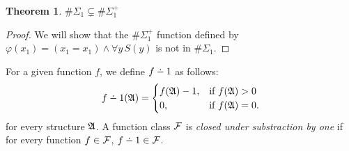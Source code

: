 \documentclass[12pt]{article}
\def\dotminus{\mathbin{\ooalign{\hss\raise1ex\hbox{.}\hss\cr
  \mathsurround=0pt$-$}}}
\def\E1{\#\Sigma_1^{+}}
\def\A{{\frak A}}
\def\F{{\cal F}}
\newtheorem{theo}{Theorem}
\begin{document}
\begin{theo}
$\#\Sigma_1 \subsetneq \E1$
\end{theo}
\begin{proof}
We will show that the $\E1$ function defined by $\varphi(x_1) = (x_1 = x_1) \wedge \forall y \, S(y)$ is not in $\#\Sigma_1$.
\end{proof}

For a given function $f$, we define $f \dotminus 1$ as follows:
\begin{eqnarray*}
f \dotminus 1(\A) =
\begin{cases}
f(\A)-1, & \text{if }f(\A) > 0 \\
0, & \text{if }f(\A) = 0.
\end{cases}
\end{eqnarray*}
for every structure $\A$. A function class $\F$ is {\em closed under substraction by one} if for every function $f \in \F$, $f \dotminus 1 \in \F$.

\end{document}
